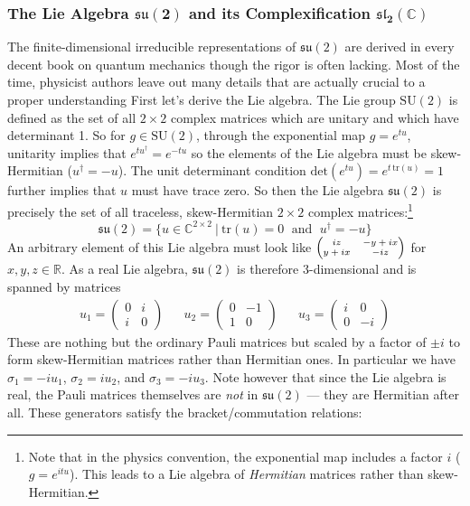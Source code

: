 \documentclass[onecolumn]{gwclass}
\renewcommand{\t}[1]{\text{#1}}
\begin{document}
\subsubsection{The Lie Algebra $\boldsymbol{\mathfrak{su}(2)}$ and its Complexification $\boldsymbol{\mathfrak{sl}_2(\mathbb{C})}$}
The finite-dimensional irreducible representations of $\mathfrak{su}(2)$ are derived in every decent book on quantum mechanics though the rigor is often lacking. Most of the time, physicist authors leave out many details that are actually crucial to a proper understanding  First let's derive the Lie algebra. The Lie group $\t{SU}(2)$ is defined as the set of all $2\times 2$ complex matrices which are unitary and which have determinant 1. So for $g\in\t{SU}(2)$, through the exponential map $g=e^{tu}$, unitarity implies that $e^{tu^\dagger}=e^{-tu}$ so the elements of the Lie algebra must be skew-Hermitian ($u^\dagger=-u$). The unit determinant condition $\t{det}(e^{tu})=e^{t\,\t{tr}(u)}=1$ further implies that $u$ must have trace zero. So then the Lie algebra $\mathfrak{su}(2)$ is precisely the set of all traceless, skew-Hermitian $2\times 2$ complex matrices:\footnote{Note that in the physics convention, the exponential map includes a factor $i$ ($g=e^{itu}$). This leads to a Lie algebra of \emph{Hermitian} matrices rather than skew-Hermitian. }
$$ \mathfrak{su}(2) = \{ u \in \mathbb{C}^{2\times 2} \:|\: \t{tr}(u)=0 \;\t{ and }\; u^\dagger =- u \} $$
An arbitrary element of this Lie algebra must look like
$ \scriptsize\begin{pmatrix}
	iz & -y+ix \\
	y +ix & -iz
\end{pmatrix} $
for $x,y,z\in\mathbb{R}$. As a real Lie algebra, $\mathfrak{su}(2)$ is therefore 3-dimensional and is spanned by matrices
 \begin{align*}
 	u_1 = \begin{pmatrix}
 		0&i\\
 		i&0
 	\end{pmatrix}
 &&
 u_2 = \begin{pmatrix}
 	0&-1\\
 	1&0
 \end{pmatrix}
&&
u_3 = \begin{pmatrix}
	i&0\\
	0&-i
\end{pmatrix}
 \end{align*}
These are nothing but the ordinary Pauli matrices but scaled by a factor of $\pm i$ to form skew-Hermitian matrices rather than Hermitian ones. In particular we have $\sigma_1=-iu_1$, $\sigma_2=iu_2$, and $\sigma_3=-iu_3$. Note however that since the Lie algebra is real, the Pauli matrices themselves are \emph{not} in $\mathfrak{su}(2)$ --- they are Hermitian after all. These generators satisfy the bracket/commutation relations:
\end{document}
